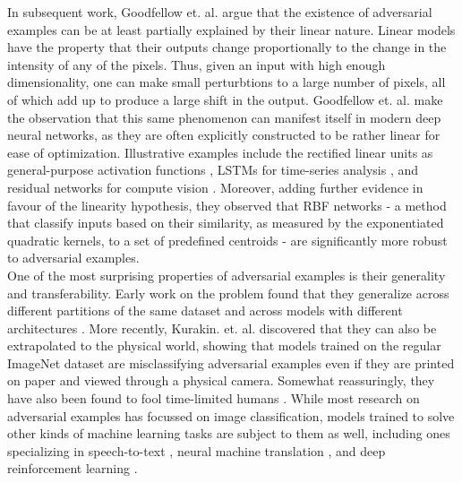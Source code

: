 \documentclass{report}
\begin{document}
\bigskip

\noindent In subsequent work, Goodfellow et. al. \cite{explaining-and-harnessing} argue that the existence of adversarial examples can be at least partially explained by their linear nature. Linear models have the property that their outputs change proportionally to the change in the intensity of any of the pixels. Thus, given an input with high enough dimensionality, one can make small perturbtions to a large number of pixels, all of which add up to produce a large shift in the output. Goodfellow et. al. make the observation that this same phenomenon can manifest itself in modern deep neural networks, as they are often explicitly constructed to be rather linear for ease of optimization. Illustrative examples include the rectified linear units as general-purpose activation functions \cite{relu}, LSTMs for time-series analysis \cite{lstm}, and residual networks for compute vision \cite{resnet}. Moreover, adding further evidence in favour of the linearity hypothesis, they observed that RBF networks \cite{rbf-networks} - a method that classify inputs based on their similarity, as measured by the exponentiated quadratic kernels, to a set of predefined centroids - are significantly more robust to adversarial examples. \\

\noindent One of the most surprising properties of adversarial examples is their generality and transferability. Early work on the problem found that they generalize across different partitions of the same dataset \cite{intriguing-properties} and across models with different architectures \cite{explaining-and-harnessing}. More recently, Kurakin. et. al. \cite{kurakin16} discovered that they can also be extrapolated to the physical world, showing that models trained on the regular ImageNet \cite{imagenet} dataset are misclassifying adversarial examples even if they are printed on paper and viewed through a physical camera. Somewhat reassuringly, they have also been found to fool time-limited humans \cite{humans-adv}. While most research on adversarial examples has focussed on image classification, models trained to solve other kinds of machine learning tasks are subject to them as well, including ones specializing in speech-to-text \cite{audio-adv}, neural machine translation \cite{nmt-adv}, and deep reinforcement learning \cite{rl-adv}. \\
\end{document}
